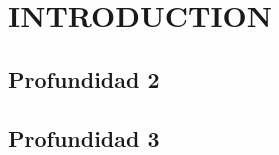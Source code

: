 \section{INTRODUCTION} \label{sec:itroduction}

\subsection{Profundidad 2}

\subsection{Profundidad 3}
